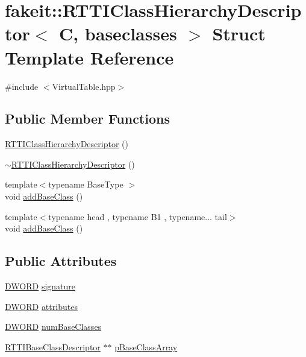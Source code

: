 \hypertarget{structfakeit_1_1RTTIClassHierarchyDescriptor}{}\section{fakeit\+::R\+T\+T\+I\+Class\+Hierarchy\+Descriptor$<$ C, baseclasses $>$ Struct Template Reference}
\label{structfakeit_1_1RTTIClassHierarchyDescriptor}


{\ttfamily \#include $<$Virtual\+Table.\+hpp$>$}

\subsection*{Public Member Functions}
\begin{DoxyCompactItemize}
\item 
\mbox{\hyperlink{structfakeit_1_1RTTIClassHierarchyDescriptor_a0a5f2b4688980dab92b8cf704a445d3c}{R\+T\+T\+I\+Class\+Hierarchy\+Descriptor}} ()
\item 
\mbox{\hyperlink{structfakeit_1_1RTTIClassHierarchyDescriptor_a44d0a0f753c90580192ddd764e2bc279}{$\sim$\+R\+T\+T\+I\+Class\+Hierarchy\+Descriptor}} ()
\item 
{\footnotesize template$<$typename Base\+Type $>$ }\\void \mbox{\hyperlink{structfakeit_1_1RTTIClassHierarchyDescriptor_ab3f66adfd7ecfdbc714bf3375bf36c38}{add\+Base\+Class}} ()
\item 
{\footnotesize template$<$typename head , typename B1 , typename... tail$>$ }\\void \mbox{\hyperlink{structfakeit_1_1RTTIClassHierarchyDescriptor_a1606624140f7c26384a76a0169ff0d03}{add\+Base\+Class}} ()
\end{DoxyCompactItemize}
\subsection*{Public Attributes}
\begin{DoxyCompactItemize}
\item 
\mbox{\hyperlink{namespacefakeit_a3d9fcff73186d3a22472ec6156db1f10}{D\+W\+O\+RD}} \mbox{\hyperlink{structfakeit_1_1RTTIClassHierarchyDescriptor_a27bf017cf881b756eff21720d1f5e4f7}{signature}}
\item 
\mbox{\hyperlink{namespacefakeit_a3d9fcff73186d3a22472ec6156db1f10}{D\+W\+O\+RD}} \mbox{\hyperlink{structfakeit_1_1RTTIClassHierarchyDescriptor_a57c2bd2b95302cdbd16cd9d2a03355df}{attributes}}
\item 
\mbox{\hyperlink{namespacefakeit_a3d9fcff73186d3a22472ec6156db1f10}{D\+W\+O\+RD}} \mbox{\hyperlink{structfakeit_1_1RTTIClassHierarchyDescriptor_a1922353f898728cb0d7138851b8f33c0}{num\+Base\+Classes}}
\item 
\mbox{\hyperlink{structfakeit_1_1RTTIBaseClassDescriptor}{R\+T\+T\+I\+Base\+Class\+Descriptor}} $\ast$$\ast$ \mbox{\hyperlink{structfakeit_1_1RTTIClassHierarchyDescriptor_a5cd5f0995225b5f88d0a448ff04666d7}{p\+Base\+Class\+Array}}
\end{DoxyCompactItemize}


